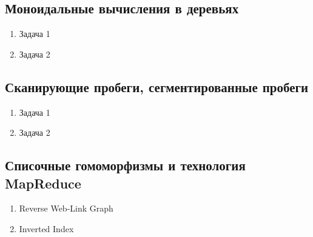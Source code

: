 \documentclass[a4paper,11pt]{article}
\begin{document}
\subsection*{Моноидальные вычисления в деревьях}
\begin{enumerate}
\item Задача 1
\item Задача 2
\end{enumerate}

\subsection*{Сканирующие пробеги, сегментированные пробеги}
\begin{enumerate}
\item Задача 1
\item Задача 2
\end{enumerate}

\subsection*{Списочные гомоморфизмы и технология MapReduce}
\begin{enumerate}
\item Reverse Web-Link Graph
\item Inverted Index
\end{enumerate}
\end{document}
